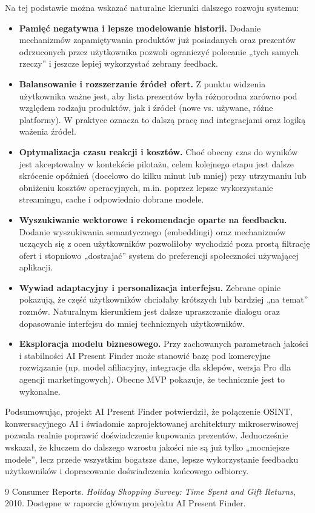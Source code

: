 \documentclass[12pt,a4paper]{article}
\begin{document}
Na tej podstawie można wskazać naturalne kierunki dalszego rozwoju systemu:
\begin{itemize}
    \item \textbf{Pamięć negatywna i lepsze modelowanie historii.} Dodanie mechanizmów zapamiętywania produktów już posiadanych oraz prezentów odrzuconych przez użytkownika pozwoli ograniczyć polecanie „tych samych rzeczy” i jeszcze lepiej wykorzystać zebrany feedback.
    \item \textbf{Balansowanie i rozszerzanie źródeł ofert.} Z punktu widzenia użytkownika ważne jest, aby lista prezentów była różnorodna zarówno pod względem rodzaju produktów, jak i źródeł (nowe vs. używane, różne platformy). W praktyce oznacza to dalszą pracę nad integracjami oraz logiką ważenia źródeł.
    \item \textbf{Optymalizacja czasu reakcji i kosztów.} Choć obecny czas do wyników jest akceptowalny w kontekście pilotażu, celem kolejnego etapu jest dalsze skrócenie opóźnień (docelowo do kilku minut lub mniej) przy utrzymaniu lub obniżeniu kosztów operacyjnych, m.in. poprzez lepsze wykorzystanie streamingu, cache i odpowiednio dobrane modele.
    \item \textbf{Wyszukiwanie wektorowe i rekomendacje oparte na feedbacku.} Dodanie wyszukiwania semantycznego (embeddingi) oraz mechanizmów uczących się z ocen użytkowników pozwoliłoby wychodzić poza prostą filtrację ofert i stopniowo „dostrajać” system do preferencji społeczności używającej aplikacji.
    \item \textbf{Wywiad adaptacyjny i personalizacja interfejsu.} Zebrane opinie pokazują, że część użytkowników chciałaby krótszych lub bardziej „na temat” rozmów. Naturalnym kierunkiem jest dalsze upraszczanie dialogu oraz dopasowanie interfejsu do mniej technicznych użytkowników.
    \item \textbf{Eksploracja modelu biznesowego.} Przy zachowanych parametrach jakości i stabilności AI Present Finder może stanowić bazę pod komercyjne rozwiązanie (np. model afiliacyjny, integracje dla sklepów, wersja Pro dla agencji marketingowych). Obecne MVP pokazuje, że technicznie jest to wykonalne.
\end{itemize}

Podsumowując, projekt AI Present Finder potwierdził, że połączenie OSINT, konwersacyjnego AI i świadomie zaprojektowanej architektury mikroserwisowej pozwala realnie poprawić doświadczenie kupowania prezentów. Jednocześnie wskazał, że kluczem do dalszego wzrostu jakości nie są już tylko „mocniejsze modele”, lecz przede wszystkim bogatsze dane, lepsze wykorzystanie feedbacku użytkowników i dopracowanie doświadczenia końcowego odbiorcy.

\begin{thebibliography}{9}
Consumer Reports.
\newblock \textit{Holiday Shopping Survey: Time Spent and Gift Returns}, 2010.
\newblock Dostępne w raporcie głównym projektu AI Present Finder.
\end{thebibliography}
\end{document}
